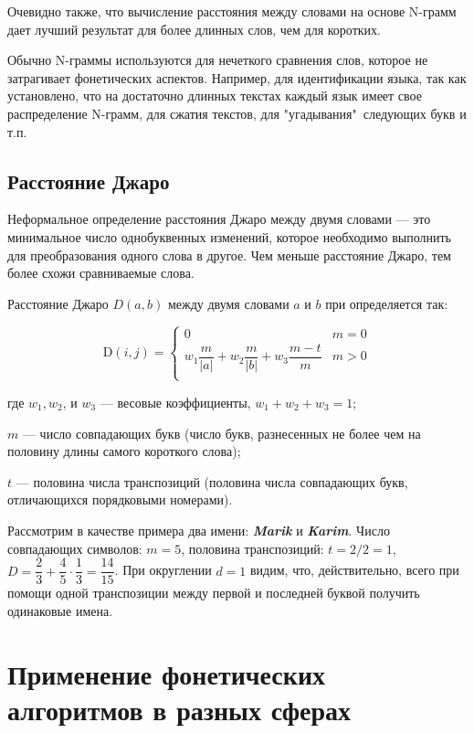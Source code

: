 \documentclass[titlepage,12pt]{article}
\begin{document}
Очевидно также, что вычисление расстояния между словами на
основе N-грамм дает лучший результат для более длинных слов,
чем для коротких.

Обычно N-граммы используются для нечеткого сравнения
слов, которое не затрагивает фонетических аспектов. Например, для идентификации языка, так как установлено, что на достаточно длинных текстах каждый язык имеет свое распределение N-грамм, для сжатия текстов, для "угадывания"\ следующих букв и т.п.

\subsection{Расстояние Джаро}

Неформальное определение расстояния Джаро между двумя словами --- это минимальное число однобуквенных изменений, которое необходимо выполнить для преобразования одного
слова в другое. Чем меньше расстояние Джаро, тем
более схожи сравниваемые слова.

Расстояние Джаро $D(a, b)$ между двумя словами $a$ и $b$ при определяется так:

\begin{equation*}
\text{D}(i,j) = 
 \begin{cases}
   0 & m = 0\\
   w_1\dfrac{m}{|a|}+w_2\dfrac{m}{|b|}+w_3\dfrac{m-t}{m} & m > 0\\
 \end{cases}
\end{equation*}

где $w_1, w_2$, и $w_3$ --- весовые коэффициенты, $w_1 + w_2 + w_3 = 1$;

$m$ --- число совпадающих букв (число букв, разнесенных не более чем на половину длины самого короткого слова); 

$t$ --- половина числа транспозиций (половина числа совпадающих букв, отличающихся порядковыми номерами).

Рассмотрим в качестве примера два имени: \textit{\textbf{Marik}} и \textit{\textbf{Karim}}. Число совпадающих символов: $m=5$, половина транспозиций: $t=2/2=1$, $D = \dfrac23 + \dfrac45 \cdot \dfrac13=\dfrac{14}{15}$. При округлении $d=1$ видим, что, действительно, всего при помощи одной транспозиции между первой и последней буквой получить одинаковые имена.

\section{Применение фонетических алгоритмов в разных сферах}
\end{document}
